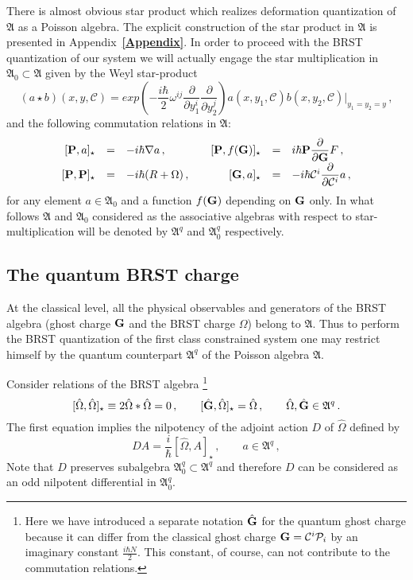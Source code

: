 \documentclass[a4paper,11pt,oneside]{amsart}
\theoremstyle{plain}
\numberwithin{equation}{section} %
\numberwithin{figure}{section} %
\newcommand{\bref}[1]{{\bf \ref{#1}}}
\newcommand{\qcommut}[2]{[#1,#2]_\star}
\def\d{\partial}
\newcommand{\dl}[1]{\displaystyle\frac{{\d}}{\d #1}}
\def\cP{{\mathcal P}}
\def\cc{{\mathcal C}}
\def\aA{{ \mathfrak A}}
\def\P{{ \bf P}}
\def\G{{ \bf G}}
\begin{document}
\noindent
There is almost obvious star product which realizes
deformation quantization of $\aA$ as a Poisson
algebra.  The explicit construction of the star product
in $\aA$ is presented in Appendix~\bref{Appendix}.  In
order to proceed with the BRST quantization of our system
we will actually engage the star multiplication
in $\aA_0 \subset \aA$ given by the Weyl star-product
\begin{equation}
\label{eq:Weyl-star-product} (a \star b)(x,y,\cc)= exp ( -\frac{i\hbar}{2}
\omega^{ij} \dl{y_1^i} \dl{y_2^j}) a(x,y_1,\cc)b(x,y_2,\cc)|_{y_1=y_2=y} \,,
\end{equation}
and the following commutation relations in $\aA$:
\begin{equation}
\begin{array}{rclrcl}
\label{eq:basic-relations}
\qcommut{\P}{a}&=&-i\hbar \nabla a\,, \quad &
\qcommut{\P}{f(\G)}&=&i\hbar \P \dl{\G} F\,, \\[5pt]
\qcommut{\P}{\P}&=&-i\hbar(R+\Omega) \,, \quad &
\qcommut{\G}{a}&=&-i\hbar  \cc^i \dl{\cc^i}a\,,
\end{array}
\end{equation}
for any element $a \in \aA_0$
and a function $f(\G)$ depending on $\G$ only.  In
what follows $\aA$ and $\aA_0$ considered
as the associative algebras with respect to
star-multiplication will be denoted by $\aA^q$
and $\aA_0^q$ respectively.


\subsection{The quantum BRST charge}
\noindent
At the classical level, all the physical observables and
generators of the BRST algebra (ghost charge ${\G}$ and the
BRST charge $\Omega$) belong to $\aA$.  Thus to perform the
BRST quantization of the first class constrained system
one may restrict himself by the quantum counterpart
$\aA^q$ of the Poisson algebra $\aA$.

\noindent
Consider relations of the BRST algebra
\footnote{Here we have introduced a separate notation
$\hat\G$ for the quantum ghost charge because it can
differ from the classical ghost charge $\G=\cc^i \cP_i$ by
an imaginary constant $\frac{i\hbar N}{2}$. This constant,
of course, can not contribute to the commutation relations.}
\begin{equation} \label{eq:main}
\qcommut{{\hat\Omega}}{{\hat\Omega}} \equiv
2{\hat\Omega}*{\hat\Omega}=0\,, \qquad
\qcommut{\hat\G}{\hat\Omega}={\hat\Omega}\,,
\qquad {\hat\Omega},{\hat\G} \in \aA^q \,.
\end{equation}
The first equation implies the nilpotency of
the adjoint action $D$ of $\hat\Omega$ defined by
\begin{equation}
D A=\frac{i}{\hbar}\qcommut{\hat\Omega}{A}\,,
\qquad a\in \aA^q\,,
\end{equation}
Note that $D$ preserves subalgebra
$\aA^q_0 \subset \aA^q$ and therefore $D$ can
be considered as an odd nilpotent differential
in $\aA^q_0$.
\end{document}
